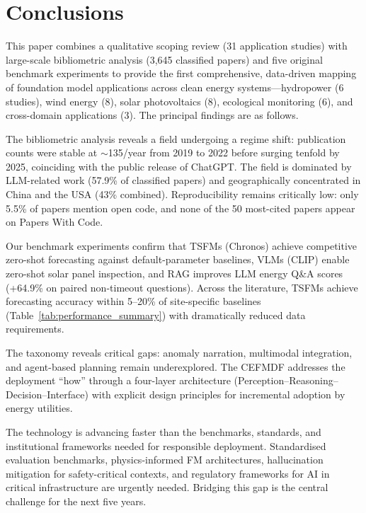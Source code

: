 \documentclass[preprint,12pt]{elsarticle}
\begin{document}
\section{Conclusions}
\label{sec:conclusions}

This paper combines a qualitative scoping review (31 application studies) with large-scale bibliometric analysis (3{,}645 classified papers) and five original benchmark experiments to provide the first comprehensive, data-driven mapping of foundation model applications across clean energy systems---hydropower (6 studies), wind energy (8), solar photovoltaics (8), ecological monitoring (6), and cross-domain applications (3). The principal findings are as follows.

The bibliometric analysis reveals a field undergoing a regime shift: publication counts were stable at ${\sim}$135/year from 2019 to 2022 before surging tenfold by 2025, coinciding with the public release of ChatGPT. The field is dominated by LLM-related work (57.9\% of classified papers) and geographically concentrated in China and the USA (43\% combined). Reproducibility remains critically low: only 5.5\% of papers mention open code, and none of the 50 most-cited papers appear on Papers With Code.

{ Our benchmark experiments confirm that TSFMs (Chronos) achieve competitive zero-shot forecasting against default-parameter baselines, VLMs (CLIP) enable zero-shot solar panel inspection, and RAG improves LLM energy Q\&A scores (+64.9\% on paired non-timeout questions). Across the literature, TSFMs achieve forecasting accuracy within 5--20\% of site-specific baselines (Table~\ref{tab:performance_summary}) with dramatically reduced data requirements.\par}

The taxonomy reveals critical gaps: anomaly narration, multimodal integration, and agent-based planning remain underexplored. The CEFMDF addresses the deployment ``how'' through a four-layer architecture (Perception--Reasoning--Decision--Interface) with explicit design principles for incremental adoption by energy utilities.

The technology is advancing faster than the benchmarks, standards, and institutional frameworks needed for responsible deployment. Standardised evaluation benchmarks, physics-informed FM architectures, hallucination mitigation for safety-critical contexts, and regulatory frameworks for AI in critical infrastructure are urgently needed. Bridging this gap is the central challenge for the next five years.
\end{document}
